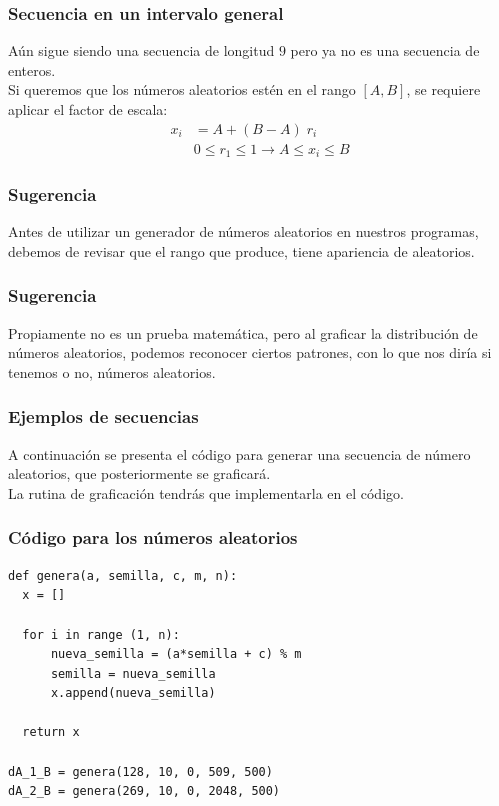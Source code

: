 \begin{frame}
\frametitle{Secuencia en un intervalo general}
Aún sigue siendo una secuencia de longitud $9$ pero ya no es una secuencia de enteros.
\\
\bigskip
Si queremos que los números aleatorios estén en el rango $[A, B]$, se requiere aplicar el factor de escala:
\begin{align*}
x_{i} &= A + (B - A) \; r_{i} \\[0.5em]
&0 \leq r_{1} \leq 1 \rightarrow A \leq x_{i} \leq B
\end{align*}
\end{frame}
\begin{frame}
\frametitle{Sugerencia}
Antes de utilizar un generador de números aleatorios en nuestros programas, debemos de revisar que el rango que produce, tiene apariencia de aleatorios.
\end{frame}
\begin{frame}
\frametitle{Sugerencia}
Propiamente no es un prueba matemática, pero al graficar la distribución de números aleatorios, podemos reconocer ciertos patrones, con lo que nos diría si tenemos o no, números aleatorios.
\end{frame}
\begin{frame}
\frametitle{Ejemplos de secuencias}
A continuación se presenta el código para generar una secuencia de número aleatorios, que posteriormente se graficará.
\\
\bigskip
La rutina de graficación tendrás que implementarla en el código.
\end{frame}
\begin{frame}
\frametitle{Código para los números aleatorios}
\begin{lstlisting}[caption=Código de distribución, style=codigopython]
def genera(a, semilla, c, m, n):
  x = []

  for i in range (1, n):
      nueva_semilla = (a*semilla + c) % m
      semilla = nueva_semilla
      x.append(nueva_semilla)

  return x

dA_1_B = genera(128, 10, 0, 509, 500)
dA_2_B = genera(269, 10, 0, 2048, 500)
\end{lstlisting}
\end{frame}

